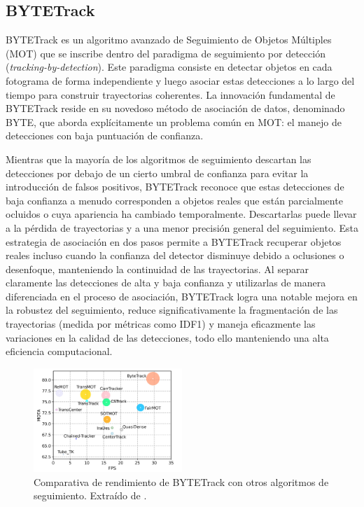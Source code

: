 \documentclass[11pt,spanish,listoffigures,listoftables]{tfgetsinf}
\begin{document}
\subsection{BYTETrack}\label{sec:bytetrack}

BYTETrack \cite{zhang2022bytetrackmultiobjecttrackingassociating} es un algoritmo avanzado de Seguimiento de Objetos Múltiples (MOT) que se inscribe dentro del paradigma de seguimiento por detección (\textit{tracking-by-detection}). Este paradigma consiste en detectar objetos en cada fotograma de forma independiente y luego asociar estas detecciones a lo largo del tiempo para construir trayectorias coherentes. La innovación fundamental de BYTETrack reside en su novedoso método de asociación de datos, denominado BYTE, que aborda explícitamente un problema común en MOT: el manejo de detecciones con baja puntuación de confianza.

Mientras que la mayoría de los algoritmos de seguimiento descartan las detecciones por debajo de un cierto umbral de confianza para evitar la introducción de falsos positivos, BYTETrack reconoce que estas detecciones de baja confianza a menudo corresponden a objetos reales que están parcialmente ocluidos o cuya apariencia ha cambiado temporalmente. Descartarlas puede llevar a la pérdida de trayectorias y a una menor precisión general del seguimiento. Esta estrategia de asociación en dos pasos permite a BYTETrack recuperar objetos reales incluso cuando la confianza del detector disminuye debido a oclusiones o desenfoque, manteniendo la continuidad de las trayectorias. Al separar claramente las detecciones de alta y baja confianza y utilizarlas de manera diferenciada en el proceso de asociación, BYTETrack logra una notable mejora en la robustez del seguimiento, reduce significativamente la fragmentación de las trayectorias (medida por métricas como IDF1) y maneja eficazmente las variaciones en la calidad de las detecciones, todo ello manteniendo una alta eficiencia computacional.

\begin{figure}[H]
   \centering
   \includegraphics[width=0.5\textwidth]{images/estado_del_arte/BYTETrack_MOTA.png}
   \caption[Comparativa de rendimiento de BYTETrack con otros algoritmos de seguimiento]{Comparativa de rendimiento de BYTETrack con otros algoritmos de seguimiento. Extraído de \cite[fig. 1, p.~1]{zhang2022bytetrackmultiobjecttrackingassociating}.}
   \label{fig:bytetrack_mota}
\end{figure}
\end{document}
